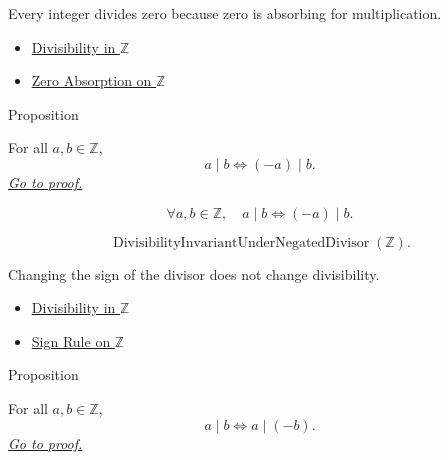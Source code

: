 \begin{remark*}[Interpretation]
Every integer divides zero because zero is absorbing for multiplication.
\end{remark*}

\begin{dependencies}
\begin{itemize}
  \item \hyperref[def:divisibility-in-z]{Divisibility in $\mathbb{Z}$}
  \item \hyperref[cor:zero-absorption-on-z]{Zero Absorption on $\mathbb{Z}$}
\end{itemize}
\end{dependencies}

\begin{propositionbox}{Proposition}
\begin{proposition}
\label{prop:divisibility-compatible-with-negation-divisor-on-z}
For all $a,b\in\mathbb{Z}$,
\[
a\mid b \Longleftrightarrow (-a)\mid b.
\]
\hyperref[prf:divisibility-compatible-with-negation-divisor-on-z]{\textit{Go to proof.}}
\end{proposition}
\end{propositionbox}

\begin{remark*}
\[
\forall a,b\in\mathbb{Z},\quad
a\mid b \Longleftrightarrow (-a)\mid b.
\]
\end{remark*}

\begin{remark*}
\[
\operatorname{DivisibilityInvariantUnderNegatedDivisor}(\mathbb{Z}).
\]
\end{remark*}

\begin{remark*}[Interpretation]
Changing the sign of the divisor does not change divisibility.
\end{remark*}

\begin{dependencies}
\begin{itemize}
  \item \hyperref[def:divisibility-in-z]{Divisibility in $\mathbb{Z}$}
  \item \hyperref[cor:sign-rule-on-z]{Sign Rule on $\mathbb{Z}$}
\end{itemize}
\end{dependencies}

\begin{propositionbox}{Proposition}
\begin{proposition}
\label{prop:divisibility-compatible-with-negation-dividend-on-z}
For all $a,b\in\mathbb{Z}$,
\[
a\mid b \Longleftrightarrow a\mid(-b).
\]
\hyperref[prf:divisibility-compatible-with-negation-dividend-on-z]{\textit{Go to proof.}}
\end{proposition}
\end{propositionbox}

